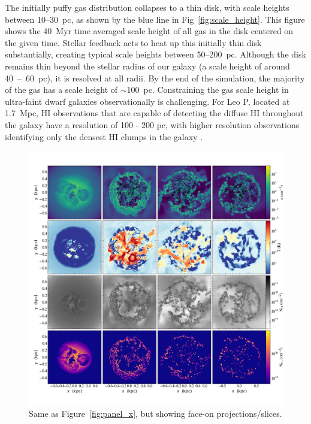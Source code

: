 \documentclass[twocolumn]{aastex61}
\begin{document}
The initially puffy gas distribution collapses to a thin disk, with scale heights between 10--30~pc, as shown by the blue line in Fig~\ref{fig:scale_height}. This figure shows the 40~Myr time averaged scale height of all gas in the disk centered on the given time. Stellar feedback acts to heat up this initially thin disk substantially, creating typical scale heights between 50--200~pc. Although the disk remains thin beyond the stellar radius of our galaxy (a scale height of around 40~--~60~pc), it is resolved at all radii. By the end of the simulation, the majority of the gas has a scale height of $\sim$100~pc. Constraining the gas scale height in ultra-faint dwarf galaxies observationally is challenging. For Leo P, located at 1.7~Mpc, HI observations that are capable of detecting the diffuse HI throughout the galaxy have a resolution of 100 - 200 pc, with higher resolution observations identifying only the densest HI clumps in the galaxy \citep[e.g.][]{Bernstein-Cooper2014}.

\begin{figure}
\centering
\includegraphics[width=0.975\linewidth]{multiplot_4x4_z.png}
\caption{Same as Figure~\ref{fig:panel_x}, but showing face-on projections/slices.}
\label{fig:panel_z}
\end{figure}
\end{document}
